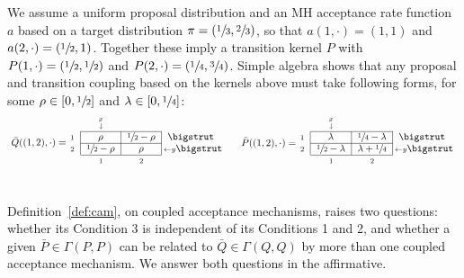 \documentclass[aihp]{imsart}
\theoremstyle{plain}
\theoremstyle{remark}
\theoremstyle{definition} \newtheorem{example}{Example}
\newcommand{\eq}[1]{\begin{align*}#1\end{align*}} %
\newcommand{\cd}{\cdot}
\newcommand{\bp}{\bar P}
\newcommand{\bq}{\bar Q}
\newcommand{\h}{\sfrac{1}{2}}
\begin{document}
\begin{appendix}
We assume a uniform proposal distribution and an MH acceptance rate function $a$ based on a target
distribution ${\pi = (\sfrac{1}{3}, \sfrac{2}{3})}$, so that $a(1, \cd) = (1,1)$ and $a(2,\cd) = (\h,
1)$. Together these imply a transition kernel $P$ with $P(1,\cd) = (\h,\h)$ and $P(2,\cd) =
(\sfrac{1}{4}, \sfrac{3}{4})$. Simple algebra shows that any proposal and transition coupling based
on the kernels above must take following forms, for some $\rho \in [0,\h]$ and $\lambda \in [0,
\sfrac{1}{4}]$:
\eq{
	\raisebox{3.5pt}{ $ \bq((1,2), \cd) = $ } \hspace{-5pt}
	\begin{blockarray}{rccl}
		& {\stackrel{x}{\scriptstyle \downarrow}} & &  \\
		\begin{block}{ r |c|c| l }
			\cline{2-3}
			{\scriptstyle 1}  & \rho & \h - \rho & \bigstrut \\
			\cline{2-3}
			{\scriptstyle 2} &\h-\rho & \rho & {\hspace{-4pt} \scriptstyle \leftarrow y} \bigstrut \\
			\cline{2-3}
		\end{block}
		\  & {\scriptstyle 1} & {\scriptstyle 2}
	\end{blockarray}
	\hspace{1em}
	\raisebox{3pt}{ $ \bp((1,2), \cd) = $ } \hspace{-5pt}
	\begin{blockarray}{rccl}
		& {\stackrel{x}{\scriptstyle \downarrow}} & &  \\
		\begin{block}{ r |c|c| l }
			\cline{2-3}
			{\scriptstyle 1}  & \lambda & \sfrac{1}{4} -\lambda & \bigstrut \\
			\cline{2-3}
			{\scriptstyle 2} &\h - \lambda & \lambda + \sfrac{1}{4} & {\hspace{-4pt} \scriptstyle \leftarrow y} \bigstrut \\
			\cline{2-3}
		\end{block}
		\  & {\scriptstyle 1} & {\scriptstyle 2}
	\end{blockarray}
}\\[-1em]
Definition~\ref{def:cam}, on coupled acceptance mechanisms, raises two questions: whether its
Condition 3 is independent of its Conditions 1 and 2, and whether a given $\bp \in \Gamma(P,P)$ can
be related to $\bq \in \Gamma(Q,Q)$ by more than one coupled acceptance mechanism. We answer both
questions in the affirmative.


\end{appendix}
\end{document}
